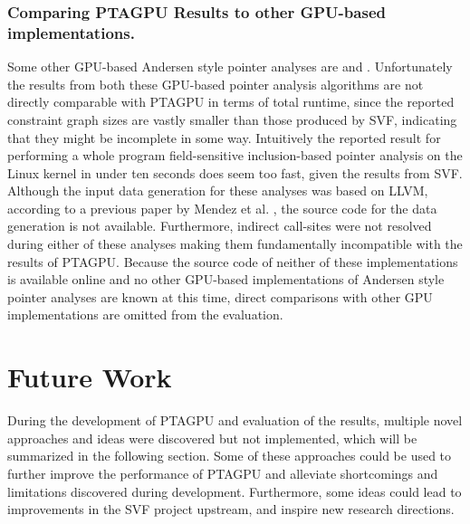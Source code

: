\subsubsection{Comparing PTAGPU Results to other GPU-based implementations.}
Some other GPU-based Andersen style pointer analyses are \cite{mendez2012gpu} and \cite{su2015efficient}.
Unfortunately the results from both these GPU-based pointer analysis algorithms are not directly comparable with PTAGPU in terms of total runtime, since the reported constraint graph sizes are vastly smaller than those produced by SVF, indicating that they might be incomplete in some way. Intuitively the reported result for performing a whole program field-sensitive inclusion-based pointer analysis on the Linux kernel in under ten seconds \cite{su2015efficient} does seem too fast, given the results from SVF.
Although the input data generation for these analyses was based on LLVM, according to a previous paper by Mendez et al. \cite{mendez2010parallel}, the source code for the data generation is not available.
Furthermore, indirect call-sites were not resolved during either of these analyses making them fundamentally incompatible with the results of PTAGPU.
Because the source code of neither of these implementations is available online and no other GPU-based implementations of Andersen style pointer analyses are known at this time, direct comparisons with other GPU implementations are omitted from the evaluation.

\section{Future Work}
During the development of PTAGPU and evaluation of the results, multiple novel approaches and ideas were discovered but not implemented, which will be summarized in the following section.
Some of these approaches could be used to further improve the performance of PTAGPU and alleviate shortcomings and limitations discovered during development.
Furthermore, some ideas could lead to improvements in the SVF project upstream, and inspire new research directions.

